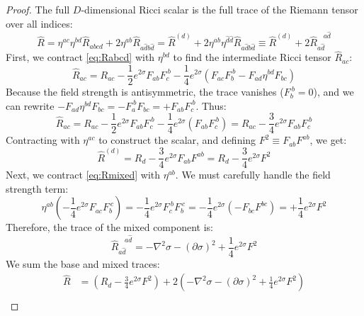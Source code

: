 \begin{tcolorbox}[breakable]
\begin{proof}
			The full $D$-dimensional Ricci scalar is the full trace of the Riemann tensor over all indices:
			\begin{equation}
				\hat{R} = \eta^{ac}\eta^{bd} \hat{R}_{abcd} + 2 \eta^{ab} \hat{R}_{a\hat{d}b\hat{d}}= \hat{R}^{(d)} + 2 \eta^{ab}\eta^{\hat{d}\hat{d}} \hat{R}_{a\hat{d}b\hat{d}} \equiv \hat{R}^{(d)} + 2 \hat{R}_{a\hat{d}}^{\ \ \ \ a\hat{d}}
			\end{equation}
			First, we contract \eqref{eq:Rabcd} with $\eta^{bd}$ to find the intermediate Ricci tensor $\hat{R}_{ac}$:
			\begin{equation}
				\hat{R}_{ac} = R_{ac} - \frac{1}{2} e^{2\sigma} F_{ab} F_c^{\ b} - \frac{1}{4} e^{2\sigma} (F_{ac} F_b^{\ b} - F_{ad} \eta^{bd} F_{bc})
			\end{equation}
			Because the field strength is antisymmetric, the trace vanishes ($F_b^{\ b} = 0$), and we can rewrite $-F_{ad} \eta^{bd} F_{bc} = -F_a^{\ b} F_{bc} = +F_{ab} F_c^{\ b}$. Thus:
			\begin{equation}
				\hat{R}_{ac} = R_{ac} - \frac{1}{2} e^{2\sigma} F_{ab} F_c^{\ b} - \frac{1}{4} e^{2\sigma} (F_{ab} F_c^{\ b}) = R_{ac} - \frac{3}{4} e^{2\sigma} F_{ab} F_c^{\ b}
			\end{equation}
			Contracting with $\eta^{ac}$ to construct the scalar, and defining $F^2 \equiv F_{ab} F^{ab}$, we get:
			\begin{equation}
				\hat{R}^{(d)} = R_d - \frac{3}{4} e^{2\sigma} F_{ab} F^{ab} = R_d - \frac{3}{4} e^{2\sigma} F^2
			\end{equation}
			Next, we contract \eqref{eq:Rmixed} with $\eta^{ab}$. We must carefully handle the field strength term:
			\begin{equation}
				\eta^{ab} \left( -\frac{1}{4} e^{2\sigma} F_{ac} F_b^{\ c} \right) = -\frac{1}{4} e^{2\sigma} F_c^{\ b} F_b^{\ c} = -\frac{1}{4} e^{2\sigma} (-F_{bc} F^{bc}) = +\frac{1}{4} e^{2\sigma} F^2
			\end{equation}
			Therefore, the trace of the mixed component is:
			\begin{equation}
				\hat{R}_{a\hat{d}}^{\ \ \ \ a\hat{d}} = -\nabla^2 \sigma - (\partial \sigma)^2 + \frac{1}{4} e^{2\sigma} F^2
			\end{equation}
			We sum the base and mixed traces:
			\begin{align}
				\hat{R} &= \left( R_d - \frac{3}{4} e^{2\sigma} F^2 \right) + 2 \left( -\nabla^2 \sigma - (\partial \sigma)^2 + \frac{1}{4} e^{2\sigma} F^2 \right) \nonumber \\

\end{align}
\end{proof}
\end{tcolorbox}
